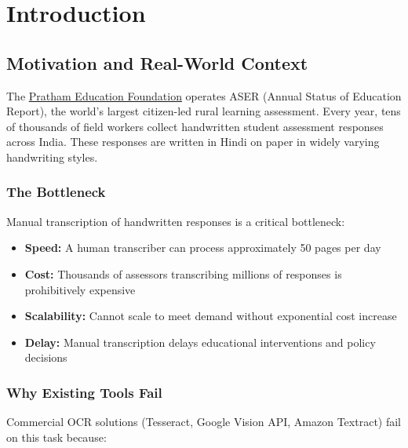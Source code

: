\documentclass[14pt,a4paper]{article}
\begin{document}
\tableofcontents
\listoffigures
\listoftables
\newpage

\section{Introduction}

\subsection{Motivation and Real-World Context}

The \href{https://www.pratham.org/about/}{Pratham Education Foundation} operates ASER (Annual Status of Education Report), the world's largest citizen-led rural learning assessment. Every year, tens of thousands of field workers collect handwritten student assessment responses across India. These responses are written in Hindi on paper in widely varying handwriting styles.

\subsubsection{The Bottleneck}

Manual transcription of handwritten responses is a critical bottleneck:
\begin{itemize}
    \item \textbf{Speed:} A human transcriber can process approximately 50 pages per day
    \item \textbf{Cost:} Thousands of assessors transcribing millions of responses is prohibitively expensive
    \item \textbf{Scalability:} Cannot scale to meet demand without exponential cost increase
    \item \textbf{Delay:} Manual transcription delays educational interventions and policy decisions
\end{itemize}

\subsubsection{Why Existing Tools Fail}

Commercial OCR solutions (Tesseract, Google Vision API, Amazon Textract) fail on this task because:
\end{document}
